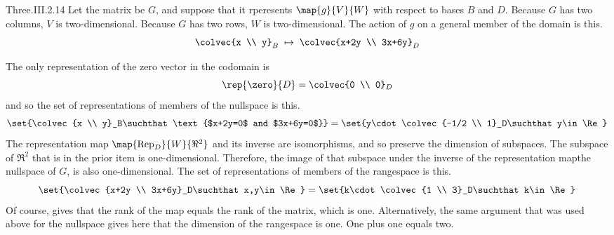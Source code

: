 \begin{ans}{Three.III.2.14}
      Let the matrix be $G$, and suppose that it rperesents $\map{g}{V}{W}$
      with respect to bases $B$ and $D$.
      Because $G$ has two columns, $V$ is two-dimensional.
      Because $G$ has two rows, $W$ is two-dimensional.
      The action of $g$ on a general member of the domain is this.
      \begin{equation*}
        \colvec{x \\ y}_B
         \;\mapsto\;
        \colvec{x+2y \\ 3x+6y}_D
      \end{equation*}
      \begin{exparts}
        \partsitem The only representation of the zero vector in the codomain
           is
           \begin{equation*}
             \rep{\zero}{D}=\colvec{0 \\ 0}_D
           \end{equation*}
           and so the set of representations of members of the nullspace is
           this.
           \begin{equation*}
             \set{\colvec{x \\ y}_B\suchthat \text{$x+2y=0$ and $3x+6y=0$}}
             =\set{y\cdot\colvec{-1/2 \\ 1}_D\suchthat y\in\Re}
           \end{equation*}
         \partsitem The representation map $\map{\mbox{Rep}_D}{W}{\Re^2}$
           and its inverse
           are isomorphisms, and so preserve the dimension of subspaces.
           The subspace of $\Re^2$ that is in the prior item is
           one-dimensional.
           Therefore, the image of that subspace under the inverse of the
           representation map\Dash the nullspace of $G$,
           is also one-dimensional.
         \partsitem The set of representations of members of the rangespace is
           this.
           \begin{equation*}
             \set{\colvec{x+2y \\ 3x+6y}_D\suchthat x,y\in\Re}
             =\set{k\cdot\colvec{1 \\ 3}_D\suchthat k\in\Re}
           \end{equation*}
         \partsitem Of course,  gives that
           the rank of the map equals the rank of the matrix, which is one.
           Alternatively, the same argument that was used above for the
           nullspace gives here that the dimension of the rangespace is one.
         \partsitem One plus one equals two.
      \end{exparts}
    
\end{ans}
